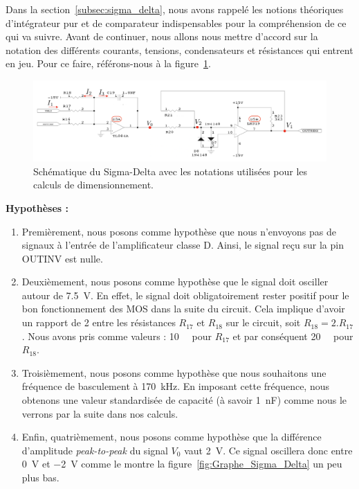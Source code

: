 \documentclass[10pt, oneside, a4paper]{article}
\begin{document}
Dans la section~\ref{subsec:sigma_delta}, nous avons rappelé les notions théoriques d'intégrateur pur et de comparateur indispensables pour la compréhension de ce qui va suivre.
Avant de continuer, nous allons nous mettre d'accord sur la notation des différents courants, tensions, condensateurs et résistances qui entrent en jeu.
Pour ce faire, référons-nous à la figure~\ref{fig:notation}. 
\begin{figure}[!ht]
    \centering
    \includegraphics[width=\textwidth]{image/Sigma_Delta_Notation.png}
    \caption{Schématique du Sigma-Delta avec les notations utilisées pour les calculs de
             dimensionnement.}
    \label{fig:notation}
\end{figure}
\newpage
\noindent\textbf{Hypothèses :}
\begin{enumerate}
    \item Premièrement, nous posons comme hypothèse que nous n'envoyons pas de signaux
        à l'entrée de l'amplificateur classe D.
        Ainsi, le signal reçu sur la pin OUTINV est nulle.
    \item Deuxièmement, nous posons comme hypothèse que le signal doit osciller autour
        de \SI{7.5}{\volt}.
        En effet, le signal doit obligatoirement rester positif pour le bon fonctionnement
        des MOS dans la suite du circuit.
        Cela implique d'avoir un rapport de 2 entre les résistances $R_{17}$ et $R_{18}$ sur
        le circuit, soit $R_{18} = 2.R_{17}$.
        Nous avons pris comme valeurs : \SI{10}{\kilo\Omega} pour $R_{17}$ et par
        conséquent \SI{20}{\kilo\Omega} pour $R_{18}$.
    \item Troisièmement, nous posons comme hypothèse que nous souhaitons une fréquence de
        basculement à \SI{170}{\kilo\hertz}.
        En imposant cette fréquence, nous obtenons une valeur standardisée de capacité
        (à savoir \SI{1}{\nano\farad}) comme nous le verrons par la suite dans nos calculs.
    \item Enfin, quatrièmement, nous posons comme hypothèse que la différence d'amplitude
        \textit{peak-to-peak} du signal $V_0$ vaut \SI{2}{\volt}. Ce signal oscillera donc
        entre \SI{0}{\volt} et \SI{-2}{\volt} comme le montre la
        figure~\ref{fig:Graphe_Sigma_Delta} un peu plus bas.
\end{enumerate}
\end{document}
